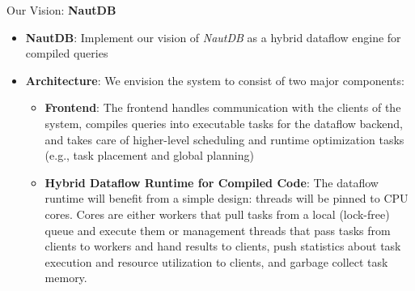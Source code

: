 \begin{block}{Our Vision: \textbf{NautDB}}
  \begin{itemize}
  \item \textbf{NautDB}: Implement our vision of \textit{NautDB} as a
    hybrid dataflow engine for compiled queries
  \item \textbf{Architecture}: We envision the system to consist of two major components:
    \begin{itemize}
    \item \textbf{Frontend}: The frontend handles communication with the clients of the system, compiles queries into executable tasks for the dataflow backend, and takes care of higher-level scheduling and runtime optimization tasks (e.g., task placement and global planning)
    \item \textbf{Hybrid Dataflow Runtime for Compiled Code}: The dataflow runtime will benefit from a simple design: threads will be pinned to CPU cores. Cores are either workers that pull tasks from a local (lock-free) queue and execute them or management threads that pass tasks from clients to workers and hand results to clients, push statistics about task execution and resource utilization to clients, and garbage collect task memory.
    \end{itemize}
  \end{itemize}
\end{block}



